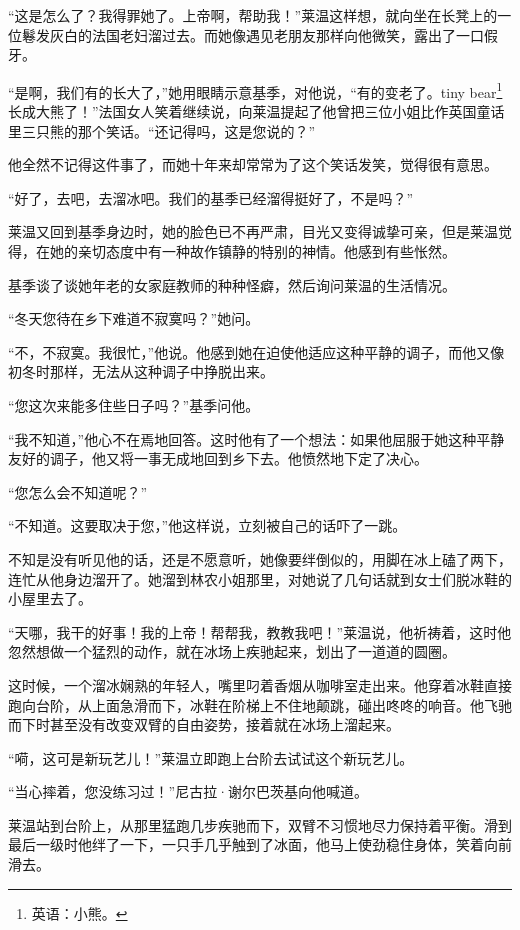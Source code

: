 \par “这是怎么了？我得罪她了。上帝啊，帮助我！”莱温这样想，就向坐在长凳上的一位鬈发灰白的法国老妇溜过去。而她像遇见老朋友那样向他微笑，露出了一口假牙。
\par “是啊，我们有的长大了，”她用眼睛示意基季，对他说，“有的变老了。tiny bear\footnote{英语：小熊。}长成大熊了！”法国女人笑着继续说，向莱温提起了他曾把三位小姐比作英国童话里三只熊的那个笑话。“还记得吗，这是您说的？”
\par 他全然不记得这件事了，而她十年来却常常为了这个笑话发笑，觉得很有意思。
\par “好了，去吧，去溜冰吧。我们的基季已经溜得挺好了，不是吗？”
\par 莱温又回到基季身边时，她的脸色已不再严肃，目光又变得诚挚可亲，但是莱温觉得，在她的亲切态度中有一种故作镇静的特别的神情。他感到有些怅然。
\par 基季谈了谈她年老的女家庭教师的种种怪癖，然后询问莱温的生活情况。
\par “冬天您待在乡下难道不寂寞吗？”她问。
\par “不，不寂寞。我很忙，”他说。他感到她在迫使他适应这种平静的调子，而他又像初冬时那样，无法从这种调子中挣脱出来。
\par “您这次来能多住些日子吗？”基季问他。
\par “我不知道，”他心不在焉地回答。这时他有了一个想法：如果他屈服于她这种平静友好的调子，他又将一事无成地回到乡下去。他愤然地下定了决心。
\par “您怎么会不知道呢？”
\par “不知道。这要取决于您，”他这样说，立刻被自己的话吓了一跳。
\par 不知是没有听见他的话，还是不愿意听，她像要绊倒似的，用脚在冰上磕了两下，连忙从他身边溜开了。她溜到林农小姐那里，对她说了几句话就到女士们脱冰鞋的小屋里去了。
\par “天哪，我干的好事！我的上帝！帮帮我，教教我吧！”莱温说，他祈祷着，这时他忽然想做一个猛烈的动作，就在冰场上疾驰起来，划出了一道道的圆圈。
\par 这时候，一个溜冰娴熟的年轻人，嘴里叼着香烟从咖啡室走出来。他穿着冰鞋直接跑向台阶，从上面急滑而下，冰鞋在阶梯上不住地颠跳，碰出咚咚的响音。他飞驰而下时甚至没有改变双臂的自由姿势，接着就在冰场上溜起来。
\par “嗬，这可是新玩艺儿！”莱温立即跑上台阶去试试这个新玩艺儿。
\par “当心摔着，您没练习过！”尼古拉·谢尔巴茨基向他喊道。
\par 莱温站到台阶上，从那里猛跑几步疾驰而下，双臂不习惯地尽力保持着平衡。滑到最后一级时他绊了一下，一只手几乎触到了冰面，他马上使劲稳住身体，笑着向前滑去。
